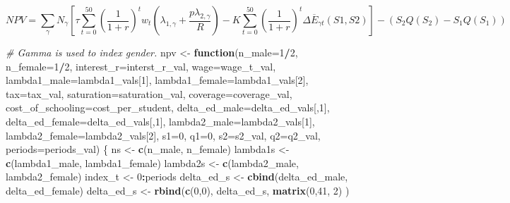 \documentclass[]{article}
\newenvironment{Shaded}{\begin{snugshade}}{\end{snugshade}}
\newcommand{\CommentTok}[1]{\textcolor[rgb]{0.56,0.35,0.01}{\textit{#1}}}
\newcommand{\ControlFlowTok}[1]{\textcolor[rgb]{0.13,0.29,0.53}{\textbf{#1}}}
\newcommand{\DataTypeTok}[1]{\textcolor[rgb]{0.13,0.29,0.53}{#1}}
\newcommand{\DecValTok}[1]{\textcolor[rgb]{0.00,0.00,0.81}{#1}}
\newcommand{\KeywordTok}[1]{\textcolor[rgb]{0.13,0.29,0.53}{\textbf{#1}}}
\newcommand{\NormalTok}[1]{#1}
\newcommand{\OperatorTok}[1]{\textcolor[rgb]{0.81,0.36,0.00}{\textbf{#1}}}
\newcommand{\StringTok}[1]{\textcolor[rgb]{0.31,0.60,0.02}{#1}}
\begin{document}
\begin{equation}
NPV =  \sum_{\gamma} N_{\gamma} \left[ 
\tau \sum_{t=0}^{50} \left( \frac{1}{1 + r}\right)^{t} w_{t} 
\left( \lambda_{1, \gamma} + \frac{p \lambda_{2, \gamma}}{R} \right) - 
K \sum_{t=0}^{50} \left( \frac{1}{1 + r}\right)^{t} \Delta \overline{E}_{\gamma t}(S1,S2)
\right] - \left( S_{2}Q(S_{2}) - S_{1}Q(S_{1}) \right)
\label{eq:1}
\tag{1}
\end{equation}

\begin{Shaded}
\begin{Highlighting}[]
\CommentTok{# Gamma is used to index gender. }
\NormalTok{npv <-}\StringTok{ }\ControlFlowTok{function}\NormalTok{(}\DataTypeTok{n_male=}\DecValTok{1}\OperatorTok{/}\DecValTok{2}\NormalTok{, }\DataTypeTok{n_female=}\DecValTok{1}\OperatorTok{/}\DecValTok{2}\NormalTok{, }
                \DataTypeTok{interest_r=}\NormalTok{interst_r_val, }
                \DataTypeTok{wage=}\NormalTok{wage_t_val, }
                \DataTypeTok{lambda1_male=}\NormalTok{lambda1_vals[}\DecValTok{1}\NormalTok{],}
                \DataTypeTok{lambda1_female=}\NormalTok{lambda1_vals[}\DecValTok{2}\NormalTok{], }
                \DataTypeTok{tax=}\NormalTok{tax_val, }
                \DataTypeTok{saturation=}\NormalTok{saturation_val, }
                \DataTypeTok{coverage=}\NormalTok{coverage_val, }
                \DataTypeTok{cost_of_schooling=}\NormalTok{cost_per_student, }
                \DataTypeTok{delta_ed_male=}\NormalTok{delta_ed_vals[,}\DecValTok{1}\NormalTok{], }
                \DataTypeTok{delta_ed_female=}\NormalTok{delta_ed_vals[,}\DecValTok{1}\NormalTok{], }
                \DataTypeTok{lambda2_male=}\NormalTok{lambda2_vals[}\DecValTok{1}\NormalTok{], }
                \DataTypeTok{lambda2_female=}\NormalTok{lambda2_vals[}\DecValTok{2}\NormalTok{], }
                \DataTypeTok{s1=}\DecValTok{0}\NormalTok{, }\DataTypeTok{q1=}\DecValTok{0}\NormalTok{, }\DataTypeTok{s2=}\NormalTok{s2_val, }\DataTypeTok{q2=}\NormalTok{q2_val, }
                \DataTypeTok{periods=}\NormalTok{periods_val) \{}
\NormalTok{  ns <-}\StringTok{ }\KeywordTok{c}\NormalTok{(n_male, n_female)}
\NormalTok{  lambda1s <-}\StringTok{ }\KeywordTok{c}\NormalTok{(lambda1_male, lambda1_female)}
\NormalTok{  lambda2s <-}\StringTok{ }\KeywordTok{c}\NormalTok{(lambda2_male, lambda2_female)}
\NormalTok{  index_t <-}\StringTok{ }\DecValTok{0}\OperatorTok{:}\NormalTok{periods}
\NormalTok{  delta_ed_s <-}\StringTok{ }\KeywordTok{cbind}\NormalTok{(delta_ed_male, delta_ed_female) }
\NormalTok{  delta_ed_s <-}\StringTok{ }\KeywordTok{rbind}\NormalTok{(}\KeywordTok{c}\NormalTok{(}\DecValTok{0}\NormalTok{,}\DecValTok{0}\NormalTok{), delta_ed_s, }\KeywordTok{matrix}\NormalTok{(}\DecValTok{0}\NormalTok{,}\DecValTok{41}\NormalTok{, }\DecValTok{2}\NormalTok{) ) }
  

\end{Highlighting}
\end{Shaded}
\end{document}
